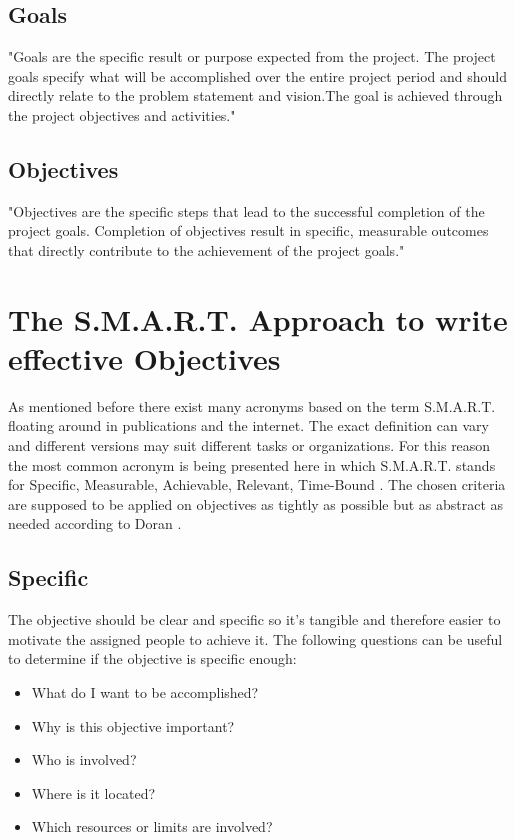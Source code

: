 \documentclass[11pt,a4paper]{article}
\begin{document}
\subsection*{Goals}
"Goals are the specific result or purpose expected from the project. The
project goals specify what will be accomplished over the entire project period
and should directly relate to the problem statement and vision.The goal is
achieved through the project objectives and activities." \cite{samhsa}

\subsection*{Objectives}
"Objectives are the specific steps that lead to the successful completion of
the project goals. Completion of objectives result in specific, measurable
outcomes that directly contribute to the achievement of the project goals."
\cite{samhsa}

\section{The S.M.A.R.T. Approach to write effective Objectives}
As mentioned before there exist many acronyms based on the term S.M.A.R.T.
floating around in publications and the internet. The exact definition can
vary and different versions may suit different tasks or organizations. For
this reason the most common acronym is being presented here in which
S.M.A.R.T.  stands for Specific, Measurable, Achievable, Relevant, Time-Bound
\cite{mindtools}. The chosen criteria are supposed to be applied on objectives
as tightly as possible but as abstract as needed according to Doran
\cite{doran1981there}.

\subsection*{Specific}
The objective should be clear and specific so it's tangible and therefore
easier to motivate the assigned people to achieve it. The following questions
can be useful to determine if the objective is specific enough:
\begin{itemize}
\item What do I want to be accomplished?
\item Why is this objective important?
\item Who is involved?
\item Where is it located?
\item Which resources or limits are involved?
\end{itemize}
\end{document}
